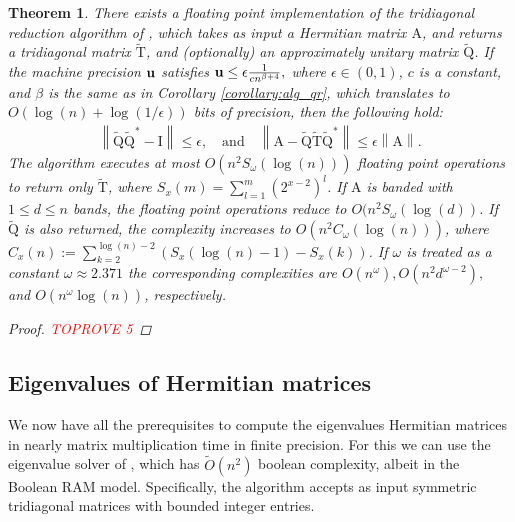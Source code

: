 \documentclass{article}
\newcommand{\lnorm}{\left\|}
\newcommand{\rnorm}{\right\|}
\newcommand{\lpar}{\left(}
\newcommand{\rpar}{\right)}
\newtheorem{theorem}{Theorem}[section]
\newcommand\matA{\boldsymbol{\mathrm{A}}}
\newcommand\matI{\boldsymbol{\mathrm{I}}}
\newcommand\matQtilde{\widetilde{\boldsymbol{\mathrm{Q}}}}
\newcommand\matTtilde{\widetilde{\boldsymbol{\mathrm{T}}}}
\newcommand{\umach}{\textbf{\textup{u}}}
\newcommand{\cmm}{\beta}
\begin{document}
\begin{theorem}
    \label{theorem:stable_tridiagonal_reduction}
    There exists a floating point implementation of the tridiagonal reduction algorithm of \cite{schonhage1972unitare}, which takes as input a Hermitian matrix $\matA$, and returns a tridiagonal matrix $\matTtilde$, and (optionally) an approximately unitary matrix $\matQtilde$. If the machine precision $\umach$ satisfies
    $
        \umach \leq \epsilon\frac{1}{cn^{\beta+4}},
    $
    where $\epsilon\in(0,1)$, $c$ is a constant, and $\cmm$ is the same as in Corollary \ref{corollary:alg_qr}, which translates to $O(\log(n)+\log(1/\epsilon))$ bits of precision, then the following hold:
    \begin{align*}
        \lnorm \matQtilde\matQtilde^*-\matI\rnorm \leq \epsilon,
        \quad
        \text{and}
        \quad
        \lnorm \matA - \matQtilde\matTtilde\matQtilde^* \rnorm \leq \epsilon \lnorm \matA \rnorm.
    \end{align*}
    The algorithm executes at most $O\lpar
                    n^2 S_{\omega}(\log(n))
    \rpar$ floating point operations to return only $\matTtilde$, where $S_x(m)=\sum_{l=1}^m (2^{x-2})^l$.
    If $\matA$ is banded with $1\leq d\leq n$ bands, the floating point operations reduce to $O(n^2 S_{\omega}(\log(d))$.
    If $\matQtilde$ is also returned, the complexity increases to $O(n^2C_{\omega}(\log(n)))$, 
    where $C_{x}(n) := 
    \sum_{k=2}^{\log(n)-2}
    \lpar
        S_{x}(\log(n)-1) - S_{x}(k)
    \rpar$. If $\omega$ is treated as a constant $\omega\approx 2.371$ the corresponding complexities are $O(n^{\omega}), O(n^2d^{\omega-2}),$ and $O(n^{\omega}\log(n))$, respectively.
    \begin{proof}\textcolor{red}{TOPROVE 5}\end{proof}
\end{theorem}

\subsection{Eigenvalues of Hermitian matrices}
\label{section:hermitian_eigenvalues}
We now have all the prerequisites to compute  the eigenvalues Hermitian matrices in nearly matrix multiplication time in finite precision.
For this we can use the eigenvalue solver of \cite{bini1991parallel}, which has $\widetilde O(n^2)$ boolean complexity, albeit in the Boolean RAM model. Specifically, the algorithm accepts as input symmetric tridiagonal matrices with bounded integer entries. 
\end{document}
